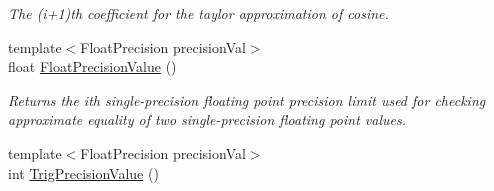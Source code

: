 \begin{DoxyCompactItemize}
\begin{DoxyCompactList}\small\item\em The (i+1)th coefficient for the taylor approximation of cosine. \end{DoxyCompactList}\item 
{\footnotesize template$<$Float\+Precision precision\+Val$>$ }\\float \hyperlink{group___scalar_math_consts_ga0d7e921997d870cf603b42e6741dd7db}{Float\+Precision\+Value} ()
\begin{DoxyCompactList}\small\item\em Returns the ith single-\/precision floating point precision limit used for checking approximate equality of two single-\/precision floating point values. \end{DoxyCompactList}\item 
\hypertarget{group___scalar_math_consts_ga342bf08edf4feeccb1f216b558064211}{}{\footnotesize template$<$Float\+Precision precision\+Val$>$ }\\int \hyperlink{group___scalar_math_consts_ga342bf08edf4feeccb1f216b558064211}{Trig\+Precision\+Value} ()\label{group___scalar_math_consts_ga342bf08edf4feeccb1f216b558064211}


\end{DoxyCompactItemize}
